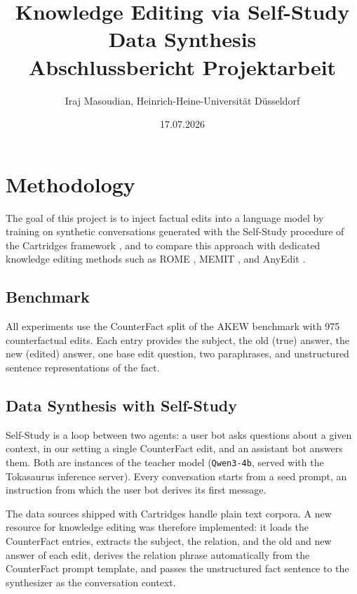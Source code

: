 \documentclass[10pt,a4paper]{article}
\title{\vspace{-1.5em}\textbf{Knowledge Editing via Self-Study Data Synthesis}\\[0.3em]
\large Abschlussbericht Projektarbeit}
\author{Iraj Masoudian, Heinrich-Heine-Universit\"at D\"usseldorf} %
\date{17.07.2026}
\begin{document}
\maketitle
\vspace{-3em}

\section{Methodology}
The goal of this project is to inject factual edits into a language model by training on
synthetic conversations generated with the Self-Study procedure of the Cartridges
framework \citep{eyuboglu2025cartridgeslightweightgeneralpurposelong}, and to compare this approach with dedicated
knowledge editing methods such as ROME \citep{meng2023locatingeditingfactualassociations}, MEMIT \citep{meng2023masseditingmemorytransformer},
and AnyEdit \citep{jiang2025anyediteditknowledgeencoded}.

\subsection{Benchmark}
All experiments use the CounterFact split of the AKEW benchmark \citep{wu2024akewassessingknowledgeediting} with
975 counterfactual edits. Each entry provides the subject, the old (true) answer, the new
(edited) answer, one base edit question, two paraphrases, and unstructured sentence
representations of the fact.

\subsection{Data Synthesis with Self-Study}
Self-Study is a loop between two agents: a user bot asks questions about a given context,
in our setting a single CounterFact edit, and an assistant bot answers them. Both are
instances of the teacher model (\texttt{Qwen3-4b}, served with the Tokasaurus inference
server). Every conversation starts from a seed prompt, an instruction from which the user
bot derives its first message.

The data sources shipped with Cartridges handle plain text corpora. A new resource for
knowledge editing was therefore implemented: it loads the CounterFact entries, extracts
the subject, the relation, and the old and new answer of each edit, derives the relation
phrase automatically from the CounterFact prompt template, and passes the unstructured
fact sentence to the synthesizer as the conversation context.
\end{document}
